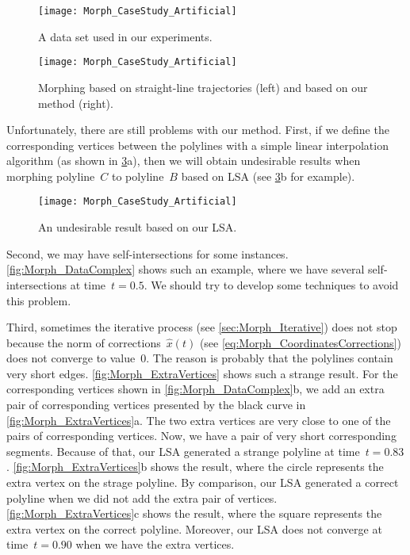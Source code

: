 \begin{figure}[tb]
	\centering	
	\texttt{[image: Morph\_CaseStudy\_Artificial]}
	\caption{A data set used in our experiments.}
	\label{fig:Morph_Data}
\end{figure}


\begin{figure}[tb]
	\centering	
	\texttt{[image: Morph\_CaseStudy\_Artificial]}
	\caption{Morphing based on 
		straight-line trajectories (left) and
		based on our method (right).}
	\label{fig:Morph_Comparison}
\end{figure}

Unfortunately, there are still problems with our method. 
First, if we define the corresponding vertices 
between the polylines 
with a simple linear interpolation algorithm
(as shown in \fig\ref{fig:Morph_Undesirable}a), 
then we will obtain undesirable results 
when morphing polyline~$C$ to polyline~$B$ 
based on LSA 
(see \fig\ref{fig:Morph_Undesirable}b for example).

\begin{figure}[tb]
	\centering	
	\texttt{[image: Morph\_CaseStudy\_Artificial]}
	\caption{An undesirable result based on our LSA.}
	\label{fig:Morph_Undesirable}
\end{figure}

Second, we may have self-intersections for some instances.
\fig\ref{fig:Morph_DataComplex} shows such an example,
where we have several self-intersections at time~$t=0.5$.  
We should try to develop some techniques 
to avoid this problem.

Third, sometimes the iterative process
(see \sect\ref{sec:Morph_Iterative})
does not stop because the norm of corrections~$\hat{x}(t)$
(see \eq\ref{eq:Morph_CoordinatesCorrections})
does not converge to value~$0$.
The reason is probably that
the polylines contain very short edges. 
\fig\ref{fig:Morph_ExtraVertices} shows such a strange result. 
For the corresponding vertices shown in 
\fig\ref{fig:Morph_DataComplex}b, 
we add an extra pair of corresponding vertices 
presented by the black curve in 
\fig\ref{fig:Morph_ExtraVertices}a.
The two extra vertices are very close to 
one of the pairs of corresponding vertices. 
Now, we have a pair of very short corresponding segments.
Because of that, our LSA generated a strange polyline 
at time~$t = 0.83$.
\fig\ref{fig:Morph_ExtraVertices}b shows the result, 
where the circle represents the extra vertex 
on the strage polyline.
By comparison, our LSA generated a correct polyline 
when we did not add the extra pair of vertices.
\fig\ref{fig:Morph_ExtraVertices}c shows the result, 
where the square represents the extra vertex 
on the correct polyline.
Moreover, our LSA does not converge 
at time~$t = 0.90$ when we have the extra vertices.

